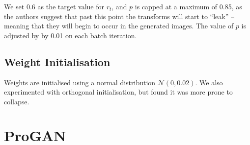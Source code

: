 We set 0.6 as the target value for $r_t$, and $p$ is capped at a maximum of 0.85, as the authors suggest that past this point the transforms will start to ``leak'' -- meaning that they will begin to occur in the generated images.
The value of $p$ is adjusted by by 0.01 on each batch iteration.

%
%            
%
%        
%        
%        

\subsection{Weight Initialisation}

Weights are initialised using a normal distribution $\mathcal{N}(0, 0.02)$.
We also experimented with orthogonal initialisation, but found it was more prone to collapse.

\section{ProGAN}


